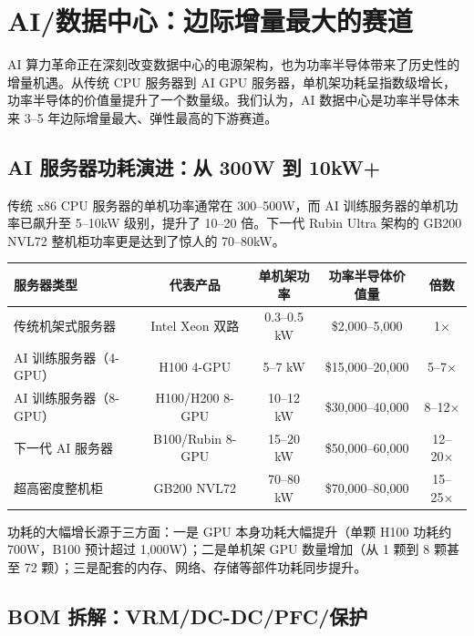 
\section{AI/数据中心：边际增量最大的赛道}

AI 算力革命正在深刻改变数据中心的电源架构，也为功率半导体带来了历史性的增量机遇。从传统 CPU 服务器到 AI GPU 服务器，单机架功耗呈指数级增长，功率半导体的价值量提升了一个数量级。我们认为，AI 数据中心是功率半导体未来 3–5 年边际增量最大、弹性最高的下游赛道。

\subsection{AI 服务器功耗演进：从 300W 到 10kW+}

传统 x86 CPU 服务器的单机功率通常在 300–500W，而 AI 训练服务器的单机功率已飙升至 5–10kW 级别，提升了 10–20 倍。下一代 Rubin Ultra 架构的 GB200 NVL72 整机柜功率更是达到了惊人的 70–80kW。

\begin{exhibitbox}[表 3-1：服务器演进与功率半导体价值量对比]
\centering
\small
\begin{tabularx}{\textwidth}{X c c c c}
\toprule
\textbf{服务器类型} & \textbf{代表产品} & \textbf{单机架功率} & \textbf{功率半导体价值量} & \textbf{倍数} \\
\midrule
传统机架式服务器 & Intel Xeon 双路 & 0.3–0.5 kW & \$2,000–5,000 & 1× \\
AI 训练服务器（4-GPU） & H100 4-GPU & 5–7 kW & \$15,000–20,000 & 5–7× \\
AI 训练服务器（8-GPU） & H100/H200 8-GPU & 10–12 kW & \$30,000–40,000 & 8–12× \\
下一代 AI 服务器 & B100/Rubin 8-GPU & 15–20 kW & \$50,000–60,000 & 12–20× \\
超高密度整机柜 & GB200 NVL72 & 70–80 kW & \$70,000–80,000 & 15–25× \\
\bottomrule
\end{tabularx}
\end{exhibitbox}

功耗的大幅增长源于三方面：一是 GPU 本身功耗大幅提升（单颗 H100 功耗约 700W，B100 预计超过 1,000W）；二是单机架 GPU 数量增加（从 1 颗到 8 颗甚至 72 颗）；三是配套的内存、网络、存储等部件功耗同步提升。

\subsection{BOM 拆解：VRM/DC-DC/PFC/保护}


